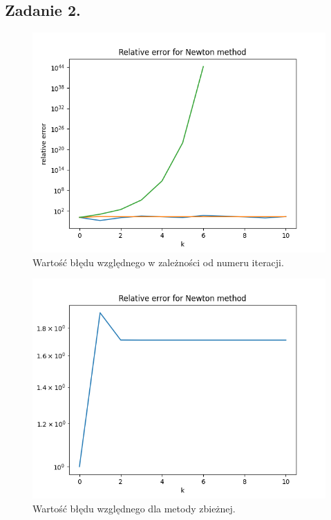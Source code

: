 \documentclass[11pt, leqno]{scrartcl}
\begin{document}
    \subsection{Zadanie 2.}
    \begin{figure}[H]
        \centering
        \includegraphics[width=0.8\linewidth]
            {g_relative_error.png}
        \caption{Wartość błędu względnego w zależności od
            numeru iteracji.}
    \end{figure}
    \begin{figure}[H]
        \centering
        \includegraphics[width=0.8\linewidth]
            {g_convergent.png}
        \caption{Wartość błędu względnego dla metody
            zbieżnej.}
    \end{figure}
\end{document}
